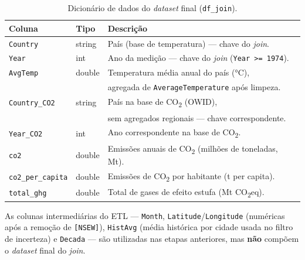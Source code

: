\begin{table}[H]
  \centering
  \begin{tabular}{lll}
    \toprule
    \textbf{Coluna} & \textbf{Tipo} & \textbf{Descrição} \\
    \midrule
    \texttt{Country} & string & País (base de temperatura) --- chave do \textit{join}. \\
    \texttt{Year} & int & Ano da medição --- chave do \textit{join} (\texttt{Year >= 1974}). \\
    \texttt{AvgTemp} & double & Temperatura média anual do país (°C), \\
                     &        & agregada de \texttt{AverageTemperature} após limpeza. \\
    \texttt{Country\_CO2} & string & País na base de CO\textsubscript{2} (OWID), \\
                          &        & sem agregados regionais --- chave correspondente. \\
    \texttt{Year\_CO2} & int & Ano correspondente na base de CO\textsubscript{2}. \\
    \texttt{co2} & double & Emissões anuais de CO\textsubscript{2} (milhões de toneladas, Mt). \\
    \texttt{co2\_per\_capita} & double & Emissões de CO\textsubscript{2} por habitante (t per capita). \\
    \texttt{total\_ghg} & double & Total de gases de efeito estufa (Mt CO\textsubscript{2}eq). \\
    \bottomrule
  \end{tabular}
  \caption{Dicionário de dados do \textit{dataset} final (\texttt{df\_join}).}
  \label{tab:dicionario}
\end{table}

As colunas intermediárias do ETL --- \texttt{Month}, \texttt{Latitude}/\texttt{Longitude}
(numéricas após a remoção de \texttt{[NSEW]}), \texttt{HistAvg} (média histórica por cidade
usada no filtro de incerteza) e \texttt{Decada} --- são utilizadas nas etapas anteriores,
mas \textbf{não} compõem o \textit{dataset} final do \textit{join}.
